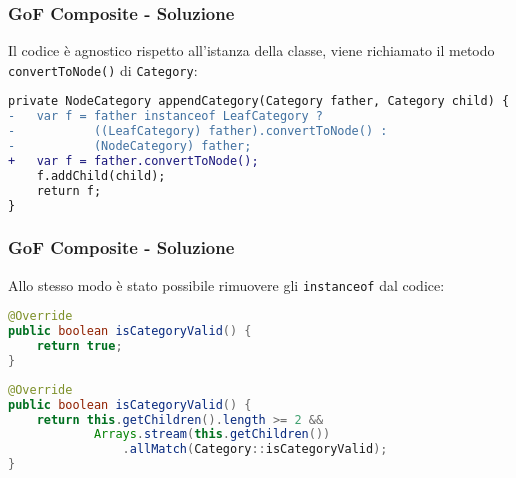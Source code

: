 \begin{frame}[fragile]
    \frametitle{GoF Composite - Soluzione}

    Il codice è agnostico rispetto all'istanza della classe, viene richiamato il metodo \texttt{convertToNode()} di \texttt{Category}:

    \lstset{style=java}
    \begin{lstlisting}[language=diff, caption={Post refactor}]
private NodeCategory appendCategory(Category father, Category child) {
-   var f = father instanceof LeafCategory ?
-           ((LeafCategory) father).convertToNode() : 
-           (NodeCategory) father;
+   var f = father.convertToNode();
    f.addChild(child);
    return f;
}
    \end{lstlisting}

\end{frame}

\begin{frame}[fragile]
    \frametitle{GoF Composite - Soluzione}

    Allo stesso modo è stato possibile rimuovere gli \texttt{instanceof} dal codice:

    \lstset{style=java}
    \begin{lstlisting}[language=java, caption={Post refactor, in LeafCategory}]
@Override
public boolean isCategoryValid() {
    return true;
}\end{lstlisting}

    \lstset{style=java}
    \begin{lstlisting}[language=java, caption={Post refactor, in NodeCategory}]
@Override
public boolean isCategoryValid() {
    return this.getChildren().length >= 2 &&
            Arrays.stream(this.getChildren())
                .allMatch(Category::isCategoryValid);
}\end{lstlisting}

\end{frame}